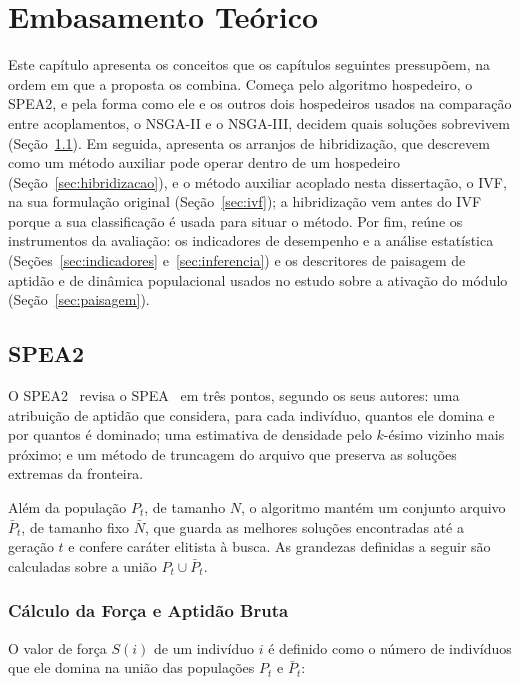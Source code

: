 \chapter{Embasamento Teórico}
\label{sec:Background}

Este capítulo apresenta os conceitos que os capítulos seguintes pressupõem, na ordem em que a proposta os combina. Começa pelo algoritmo hospedeiro, o SPEA2, e pela forma como ele e os outros dois hospedeiros usados na comparação entre acoplamentos, o NSGA-II e o NSGA-III, decidem quais soluções sobrevivem (Seção~\ref{sec:spea2}). Em seguida, apresenta os arranjos de hibridização, que descrevem como um método auxiliar pode operar dentro de um hospedeiro (Seção~\ref{sec:hibridizacao}), e o método auxiliar acoplado nesta dissertação, o IVF, na sua formulação original (Seção~\ref{sec:ivf}); a hibridização vem antes do IVF porque a sua classificação é usada para situar o método. Por fim, reúne os instrumentos da avaliação: os indicadores de desempenho e a análise estatística (Seções~\ref{sec:indicadores} e~\ref{sec:inferencia}) e os descritores de paisagem de aptidão e de dinâmica populacional usados no estudo sobre a ativação do módulo (Seção~\ref{sec:paisagem}).

\section{SPEA2}
\label{sec:spea2}

O SPEA2~\cite{zitzler2001spea2} revisa o SPEA~\cite{zitzler1998evolutionary} em três pontos, segundo os seus autores: uma atribuição de aptidão que considera, para cada indivíduo, quantos ele domina e por quantos é dominado; uma estimativa de densidade pelo $k$-ésimo vizinho mais próximo; e um método de truncagem do arquivo que preserva as soluções extremas da fronteira.

Além da população $P_t$, de tamanho $N$, o algoritmo mantém um conjunto arquivo $\bar{P}_t$, de tamanho fixo $\bar{N}$, que guarda as melhores soluções encontradas até a geração $t$ e confere caráter elitista à busca. As grandezas definidas a seguir são calculadas sobre a união $P_t \cup \bar{P}_t$.

\subsection{Cálculo da Força e Aptidão Bruta}

O valor de força $S(i)$ de um indivíduo $i$ é definido como o número de indivíduos que ele domina na união das populações $P_t$ e $\bar{P}_t$:

